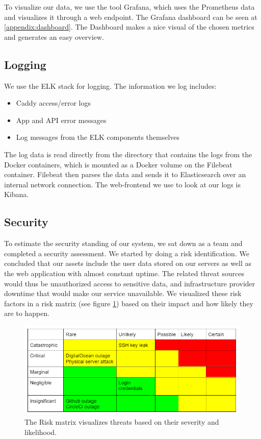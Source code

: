 To visualize our data, we use the tool Grafana, which uses the Prometheus data and visualizes it through a web endpoint. The Grafana dashboard can be seen at \ref{appendix:dashboard}. The Dashboard makes a nice visual of the chosen metrics and generates an easy overview.

\subsection{Logging}
We use the ELK stack for logging. The information we log includes:

\begin{itemize}
    \item Caddy access/error logs
    \item App and API error messages
    \item Log messages from the ELK components themselves
\end{itemize}

The log data is read directly from the directory that contains the logs from the Docker containers, which is mounted as a Docker volume on the Filebeat container. Filebeat then parses the data and sends it to Elasticsearch over an internal network connection. The web-frontend we use to look at our logs is Kibana.




\subsection{Security}
To estimate the security standing of our system, we sat down as a team and completed a security assessment. We started by doing a risk identification. We concluded that our assets include the user data stored on our servers as well as the web application with almost constant uptime. The related threat sources would thus be unauthorized access to sensitive data, and infrastructure provider downtime that would make our service unavailable. We visualized these risk factors in a risk matrix (see figure \ref{fig:Risk_matrix}) based on their impact and how likely they are to happen.

\begin{figure}[H]
    \centering
    \includegraphics[scale=0.85]{images/risk_matrix.png}
    \caption{The Risk matrix visualizes threats based on their severity and likelihood.}
    \label{fig:Risk_matrix}
\end{figure}


